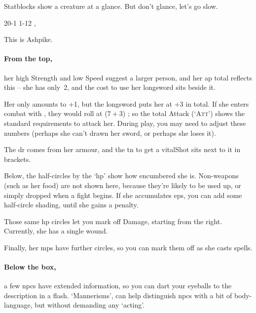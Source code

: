 Statblocks show a creature at a glance.
But don't glance, let's go slow.


%
  {{2}{0}{-1}}%
  {{1}{-1}{2}}%
  {
    \setcounter{Academics}{2}
    \setcounter{Crafts}{2}
    \setcounter{Medicine}{1}
    \setcounter{Combat}{1}
    \setcounter{Fire}{2}
    \setcounter{Air}{2}
    \setcounter{Earth}{1}
    \longsword
    \partialleather
  }%
  {}%
  {%
    \lootMagic, \rations
  }%
  {}%

This is Ashpike.
\paragraph{From the top,}
her high Strength and low Speed suggest a larger person, and her \gls{ap} total reflects this -- she has only~2, and the cost to use her longsword sits beside it.

Her  only amounts to +1, but the longsword puts her at +3 in total.
If she enters combat with , they would roll at ($7+3$) \tn[10]; so the total Attack (`{\scshape Att}') shows the standard requirements to attack her.
During play, you may need to adjust these numbers (perhaps she can't drawn her sword, or perhaps she loses it).

The \gls{dr} comes from her armour, and the \gls{tn} to get a \gls{vitalShot} sits next to it in brackets.

Below, the half-circles by the `\gls{hp}' show how encumbered she is.
Non-weapons (such as her food) are not shown here, because they're likely to be used up, or simply dropped when a fight begins.
If she accumulates \glspl{ep}, you can add some half-circle shading, until she gains a penalty.

Those same \gls{hp} circles let you mark off Damage, starting from the right.
Currently, she has a single wound.

Finally, her \glspl{mp} have further circles, so you can mark them off as she casts spells.

\paragraph{Below the box,}
a few \glspl{npc} have extended information, so you can dart your eyeballs to the description in a flash.
`Mannerisms', can help distinguish \glspl{npc} with a bit of body-language, but without demanding any `acting'.

